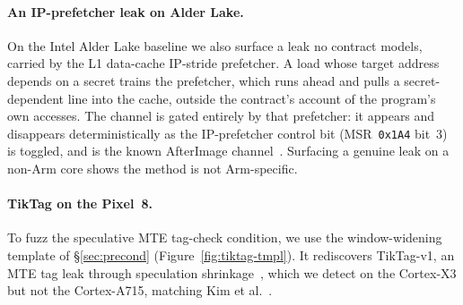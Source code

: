 \documentclass[letterpaper,twocolumn,10pt]{article}
\theoremstyle{definition}
\begin{document}
\paragraph{An IP-prefetcher leak on Alder Lake.}
On the Intel Alder Lake baseline we also surface a leak no contract models, carried by the L1
data-cache IP-stride prefetcher. A load whose target address depends on a secret trains the
prefetcher, which runs ahead and pulls a secret-dependent line into the cache, outside the
contract's account of the program's own accesses. The channel is gated entirely by that
prefetcher: it appears and disappears deterministically as the IP-prefetcher control bit
(MSR~\texttt{0x1A4} bit~3) is toggled, and is the known AfterImage channel~\cite{afterimage}.
Surfacing a genuine leak on a non-Arm core shows the method is not Arm-specific.

\paragraph{TikTag on the Pixel~8.}
To fuzz the speculative MTE tag-check condition, we use the window-widening template of
\S\ref{sec:precond} (Figure~\ref{fig:tiktag-tmpl}). It rediscovers TikTag-v1, an MTE tag leak
through speculation shrinkage~\cite{tiktag}, which we detect on the Cortex-X3 but not the
Cortex-A715, matching Kim et al.~\cite{tiktag}.
\end{document}
